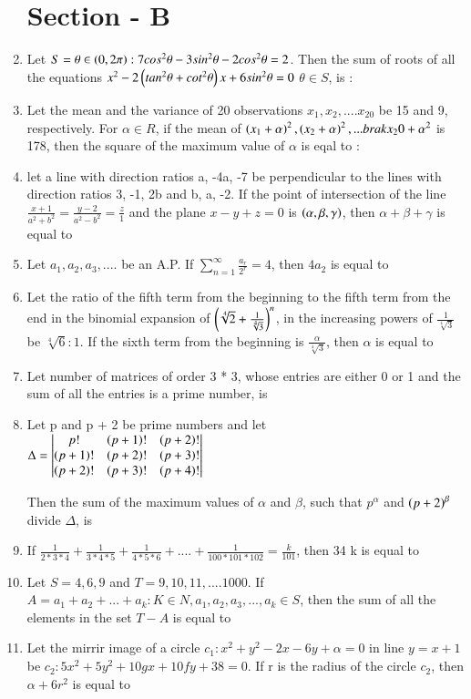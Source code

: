 \documentclass[journal,12pt,onecolumn]{IEEEtran}
\theoremstyle{remark}
\begin{document}
\begin{enumerate}
\section{Section - B}
\item Let $S = \theta \in \left(0,2\pi\right) : 7 cos^2\theta - 3 sin^2 \theta - 2 cos^2\theta = 2$. Then the sum of roots of all the equations $x^2 - 2 \left(tan^2\theta + cot^2\theta\right) x + 6 sin^2\theta = 0 $ $\theta \in S$, is :
\item Let the mean and the variance of 20 observations $x_1,x_2,....x_20$ be 15 and 9, respectively. For $\alpha \in R$, if the mean of $\left(x_1 + \alpha\right)^2,\left(x_2 + \alpha\right)^2,...brak{x_20 + \alpha}^2$ is 178, then the square of the maximum value of $\alpha$ is eqal to :
\item let a line with direction ratios a, -4a, -7 be perpendicular to the lines with direction ratios 3, -1, 2b and b, a, -2. If the point of intersection of the line $\frac{x + 1}{a^2 +b^2} = \frac{y - 2}{a^2 - b^2} = \frac{z}{1}$ and the plane $x - y + z = 0$ is $\left(\alpha, \beta, \gamma\right)$, then $\alpha + \beta + \gamma$ is equal to 
\item Let $a_1, a_2, a_3,....$ be an A.P. If $\sum_{n=1}^{\infty} \frac{a_r}{2^r}=4$, then $4a_2$ is equal to 
\item Let the ratio of the fifth term from the beginning to the fifth term from the end in the binomial expansion of $\left(\sqrt[4]{2}+\frac{1}{\sqrt[4]{3}}\right)^n$, in the increasing powers of $\frac{1}{\sqrt[4]{3}}$ be $\sqrt[4]{6} : 1$. If the sixth term from the beginning is $\frac{\alpha}{\sqrt[4]{3}}$, then $\alpha$ is equal to 
\item Let number of matrices of order 3 * 3, whose entries are either 0 or 1 and the sum of all the entries is a prime number, is 
\item Let p and p + 2 be prime numbers and let \\
$\Delta = 
\begin{vmatrix}
p! & \left(p+1\right)! & \left(p+2\right)! \\
\left(p+1\right)! & \left(p+2\right)! & \left(p+3\right)! \\
\left(p+2\right)! & \left(p+3\right)! & \left(p+4\right)!
\end{vmatrix}$

Then the sum of the maximum values of $\alpha$ and $\beta$, such that $p^\alpha$ and $\left(p +2\right)^\beta$ divide $\Delta$, is 
\item If $\frac{1}{2*3*4} + \frac{1}{3*4*5} + \frac{1}{4*5*6} +....+ \frac{1}{100*101*102} = \frac{k}{101}$, then 34 k is equal to
\item Let $S = {4,6,9}$ and $T = {9,10,11,....1000}$. If $A = {a_1+a_2+...+a_k : K\in N, a_1,a_2,a_3,...,a_k \in S}$, then the sum of all the elements in the set $T - A$ is equal to 
\item Let the mirrir image of a circle $c_1 : x^2 +y^2 - 2x - 6y +\alpha = 0$ in line $y = x + 1$ be $c_2 : 5x^2 + 5y^2 +10gx + 10fy + 38 =  0.$ If r is the radius of the circle $c_2$, then $\alpha + 6r^2$ is equal to
\end{enumerate}
\end{document}
